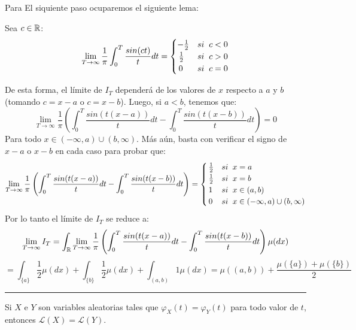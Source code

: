 Para El siquiente paso ocuparemos el siguiente lema:
\begin{lem} Sea $c\in\R$:
\[\lim_{T \to \infty}\frac{1}{\pi}\int_{0}^{T}\frac{sin(ct)}{t}dt = \begin{cases}
                -\frac{1}{2} & si\hspace{0.2cm}c<0\\
                \,\frac{1}{2} & si\hspace{0.2cm}c>0\\
                \,0 & si\hspace{0.2cm} c=0
                \end{cases}\]
\end{lem}
De esta forma, el límite de $I_T$ dependerá de los valores de $x$ respecto a $a$ y $b$ (tomando $c=x-a$ o $c=x-b$). Luego, si $a<b$, tenemos que:
\[\lim_{T\to \infty}\frac{1}{\pi}\left(\int_{0}^{T}\frac{sin(t(x-a))}{t}dt - \int_{0}^{T}\frac{sin(t(x-b))}{t}dt\right) = 0\]
Para todo $x \in (-\infty ,a)\cup (b,\infty)$. Más aún, basta con verificar el signo de $x-a$ o $x-b$ en cada caso para probar que:
\[\lim_{T\to \infty}\frac{1}{\pi}\left(\int_{0}^{T}\frac{sin(t(x-a))}{t}dt - \int_{0}^{T}\frac{sin(t(x-b))}{t}dt\right) = \begin{cases}
\,\frac{1}{2} & si\hspace{0.2cm}x=a\\
\,\frac{1}{2} & si\hspace{0.2cm}x=b\\
\,1 & si\hspace{0.2cm}x\in(a,b)\\
\,0 & si\hspace{0.2cm}x\in(-\infty,a)\cup(b,\infty)
\end{cases}\]
Por lo tanto el límite de $I_T$ se reduce a:
\[\lim_{T\to \infty}I_T = \int_{\R}\lim_{T\to \infty}\frac{1}{\pi}\left(\int_{0}^{T}\frac{sin(t(x-a))}{t}dt - \int_{0}^{T}\frac{sin(t(x-b))}{t}dt\right)\mu(dx)\]
\[= \int_{\{a\}}\frac{1}{2}\mu(dx) + \int_{\{b\}}\frac{1}{2}\mu(dx) + \int_{(a,b)}1\mu(dx) = \mu((a,b)) + \frac{\mu(\{a\})+\mu(\{b\})}{2}\]
\rule{0.7em}{0.7em}

\begin{cor}
Si $X$ e $Y$ son variables aleatorias tales que $\varphi_X(t) = \varphi_Y(t)$ para todo valor de $t$, entonces $\mathcal{L}(X)=\mathcal{L}(Y)$.
\end{cor}

